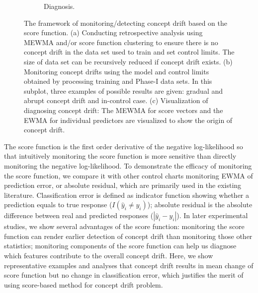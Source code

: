 \documentclass[twoside,11pt]{article}
\begin{document}
\begin{figure}[!htbp]
\begin{subfigure}[t]{0.49\linewidth}
         \caption{Diagnosis.}
         \label{fig:diagnosis}
  \end{subfigure}
  \caption{{The framework of monitoring/detecting concept drift based on the score function. (a) Conducting retrospective analysis using MEWMA and/or score function clustering to ensure there is no concept drift in the data set used to train and set control limits. The size of data set can be recursively reduced if concept drift exists. (b) Monitoring concept drifts using the model and control limits obtained by processing training and Phase-I data sets. In this subplot, three examples of possible results are given: gradual and abrupt concept drift and in-control case. (c) Visualization of diagnosing concept drift: The MEWMA for score vectors and the EWMA for individual predictors are visualized to show the origin of concept drift.}}
  \label{fig:proc_mon_score}
\end{figure}

The score function is the first order derivative of the negative log-likelihood so that intuitively monitoring the score function is more sensitive than directly monitoring the negative log-likelihood. To demonstrate the efficacy of monitoring the score function, we compare it with other control charts monitoring EWMA of prediction error, or absolute residual, which are primarily used in the existing literature. Classification error is defined as indicator function showing whether a prediction equals to true response ($I(\hat {y}_i \neq y_i)$); absolute residual is the absolute difference between real and predicted responses ($|\hat {y}_i - y_i|$). In later experimental studies, we show several advantages of the score function: monitoring the score function can render earlier detection of concept drift than monitoring those other statistics; monitoring components of the score function can help us diagnose which features contribute to the overall concept drift. Here, we show representative examples and analyses that concept drift results in mean change of score function but no change in classification error, which justifies the merit of using score-based method for concept drift problem. 
\end{document}
